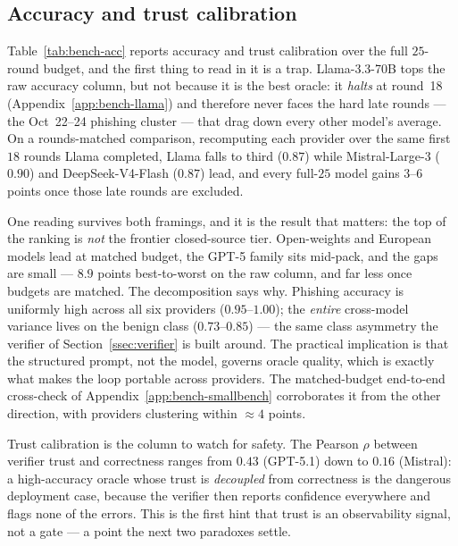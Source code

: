 \subsection{Accuracy and trust calibration}
\label{app:bench-acc}

Table~\ref{tab:bench-acc} reports accuracy and trust calibration over the full
$25$-round budget, and the first thing to read in it is a trap. Llama-3.3-70B tops
the raw accuracy column, but not because it is the best oracle: it \emph{halts}
at round~18 (Appendix~\ref{app:bench-llama}) and therefore never faces the hard
late rounds --- the Oct~22--24 phishing cluster --- that drag down every other
model's average. On a rounds-matched comparison, recomputing each provider over
the same first $18$ rounds Llama completed, Llama falls to third ($0.87$) while
Mistral-Large-3 ($0.90$) and DeepSeek-V4-Flash ($0.87$) lead, and every full-$25$
model gains $3$--$6$ points once those late rounds are excluded.

One reading survives both framings, and it is the result that matters: the top of
the ranking is \emph{not} the frontier closed-source tier. Open-weights and
European models lead at matched budget, the GPT-5 family sits mid-pack, and the
gaps are small --- $8.9$ points best-to-worst on the raw column, and far less once
budgets are matched. The decomposition says why. Phishing accuracy is uniformly
high across all six providers ($0.95$--$1.00$); the \emph{entire} cross-model
variance lives on the benign class ($0.73$--$0.85$) --- the same class asymmetry
the verifier of Section~\ref{ssec:verifier} is built around. The practical
implication is that the structured prompt, not the model, governs oracle quality,
which is exactly what makes the loop portable across providers. The matched-budget
end-to-end cross-check of Appendix~\ref{app:bench-smallbench} corroborates it from
the other direction, with providers clustering within $\approx 4$ points.

Trust calibration is the column to watch for safety. The Pearson $\rho$ between
verifier trust and correctness ranges from $0.43$ (GPT-5.1) down to $0.16$
(Mistral): a high-accuracy oracle whose trust is \emph{decoupled} from correctness
is the dangerous deployment case, because the verifier then reports confidence
everywhere and flags none of the errors. This is the first hint that trust is an
observability signal, not a gate --- a point the next two paradoxes settle.

